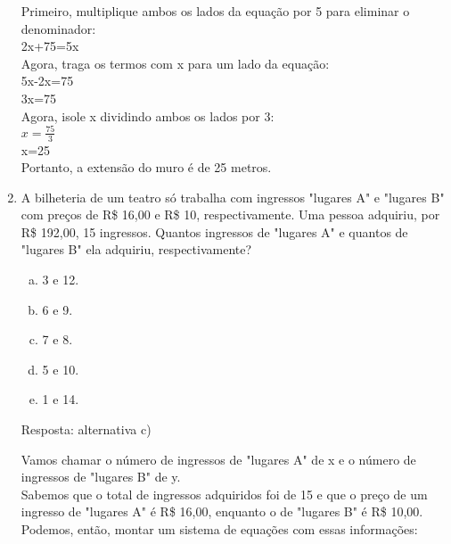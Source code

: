 \documentclass[a4paper,14pt]{article}
\begin{document}
\begin{multicols}{2}
\begin{enumerate}
        Primeiro, multiplique ambos os lados da equação por 5 para eliminar o denominador:\\
        
        2x+75=5x\\
        
        Agora, traga os termos com x para um lado da equação:\\
        
        5x-2x=75\\
        
        3x=75\\
        
        Agora, isole x dividindo ambos os lados por 3:\\
        $x = \frac{75}{3}$\\
        x=25\\
        
        Portanto, a extensão do muro é de 25 metros.\\
        
        \newpage
        
        \item A bilheteria de um teatro só trabalha com ingressos "lugares A" e "lugares B" com preços de R\$ 16,00 e R\$ 10, respectivamente. Uma pessoa adquiriu, por R\$ 192,00, 15 ingressos. Quantos ingressos de "lugares A" e quantos de "lugares B" ela adquiriu, respectivamente?
        \begin{enumerate}[a)]
        	\item 3 e 12.
        	\item 6 e 9.
        	\item 7 e 8.
        	\item 5 e 10.
        	\item 1 e 14.
        \end{enumerate}
    
        Resposta: alternativa c)
        
        Vamos chamar o número de ingressos de "lugares A" de
        x e o número de ingressos de "lugares B" de y. \\
        
        Sabemos que o total de ingressos adquiridos foi de 15 e que o preço de um ingresso de "lugares A" é R\$ 16,00, enquanto o de "lugares B" é R\$ 10,00. \\
        
        Podemos, então, montar um sistema de equações com essas informações:\\
        

\end{enumerate}
\end{multicols}
\end{document}
